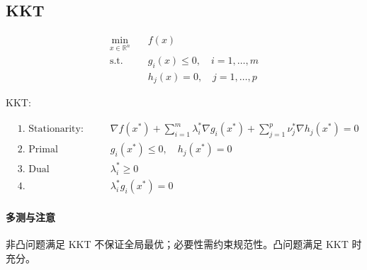 \subsection{KKT}

$$\begin{aligned}
\min_{x \in \mathbb{R}^n} \quad & f(x) \\
\text{s.t.} \quad & g_i(x) \le 0, \quad i = 1, \dots, m \\
& h_j(x) = 0, \quad j = 1, \dots, p
\end{aligned}$$

KKT:

$$\begin{aligned}
&\text{1. Stationarity:} && \nabla f(x^*) + \sum_{i=1}^m \lambda_i^* \nabla g_i(x^*) + \sum_{j=1}^p \nu_j^* \nabla h_j(x^*) = 0 \\
&\text{2. Primal Feasibility:} && g_i(x^*) \le 0, \quad h_j(x^*) = 0 \\
&\text{3. Dual Feasibility:} && \lambda_i^* \ge 0 \\
&\text{4. Complementary Slackness:} && \lambda_i^* g_i(x^*) = 0
\end{aligned}$$


\paragraph{多测与注意} 非凸问题满足 KKT 不保证全局最优；必要性需约束规范性。凸问题满足 KKT 时充分。
